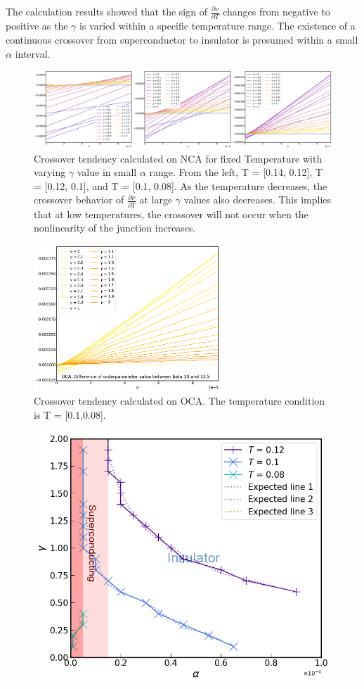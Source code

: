 \documentclass{article}
\begin{document}
\begin{spacing}{1.3}
The calculation results showed that the sign of $\frac{\partial \nu}{\partial T}$ changes from negative to positive 
as the $\gamma$ is varied within a specific temperature range. The existence of a continuous crossover from superconductor 
to insulator is presumed within a small $\alpha$ interval.
\pagebreak
\begin{figure}[H]
  \vfill
  \centerline{\includegraphics[width=13cm]{TexFigure/4/4_3_13_litlalp_1.png}}
  \caption{Crossover tendency calculated on NCA for fixed Temperature with varying $\gamma$ value in small $\alpha$ range. From the left, T = [0.14, 0.12], T = [0.12, 0.1], and T = [0.1, 0.08]. As the temperature decreases, the crossover behavior of $\frac{\partial \nu}{\partial T}$ 
  at large $\gamma$ values also decreases. This implies that at low temperatures, the crossover will not occur when the nonlinearity of the junction increases.}
  \vfill
\end{figure}
\begin{figure}[H]
  \centerline{\includegraphics[width=7cm]{TexFigure/4/4_3_14_Diff_Os3_b_10_12.5_n.png}}
  \caption{Crossover tendency calculated on OCA. The temperature condition is T = [0.1,0.08].}
\vfill
\end{figure}
\pagebreak
\begin{figure}[H]
  \vfill
  \centerline{\includegraphics[width=12cm]{TexFigure/4/4_3_15_Expecregi.png}}

\end{figure}
\end{spacing}
\end{document}
